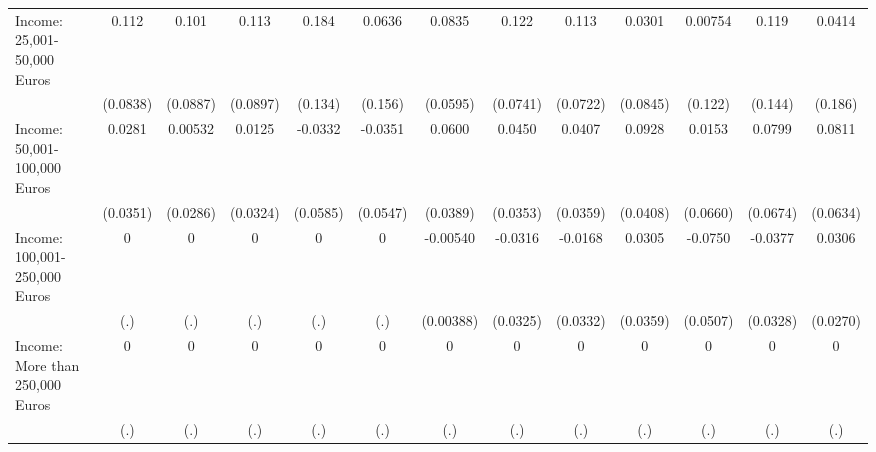 {\begin{tabular}{l*{12}{c}}
\addlinespace
Income: 25,001-50,000 Euros&       0.112         &       0.101         &       0.113         &       0.184         &      0.0636         &      0.0835         &       0.122         &       0.113         &      0.0301         &     0.00754         &       0.119         &      0.0414         \\
            &    (0.0838)         &    (0.0887)         &    (0.0897)         &     (0.134)         &     (0.156)         &    (0.0595)         &    (0.0741)         &    (0.0722)         &    (0.0845)         &     (0.122)         &     (0.144)         &     (0.186)         \\
\addlinespace
Income: 50,001-100,000 Euros&      0.0281         &     0.00532         &      0.0125         &     -0.0332         &     -0.0351         &      0.0600         &      0.0450         &      0.0407         &      0.0928\sym{*}  &      0.0153         &      0.0799         &      0.0811         \\
            &    (0.0351)         &    (0.0286)         &    (0.0324)         &    (0.0585)         &    (0.0547)         &    (0.0389)         &    (0.0353)         &    (0.0359)         &    (0.0408)         &    (0.0660)         &    (0.0674)         &    (0.0634)         \\
\addlinespace
Income: 100,001-250,000 Euros&           0         &           0         &           0         &           0         &           0         &    -0.00540         &     -0.0316         &     -0.0168         &      0.0305         &     -0.0750         &     -0.0377         &      0.0306         \\
            &         (.)         &         (.)         &         (.)         &         (.)         &         (.)         &   (0.00388)         &    (0.0325)         &    (0.0332)         &    (0.0359)         &    (0.0507)         &    (0.0328)         &    (0.0270)         \\
\addlinespace
Income: More than 250,000 Euros&           0         &           0         &           0         &           0         &           0         &           0         &           0         &           0         &           0         &           0         &           0         &           0         \\
            &         (.)         &         (.)         &         (.)         &         (.)         &         (.)         &         (.)         &         (.)         &         (.)         &         (.)         &         (.)         &         (.)         &         (.)         \\
\bottomrule
\end{tabular}
}
